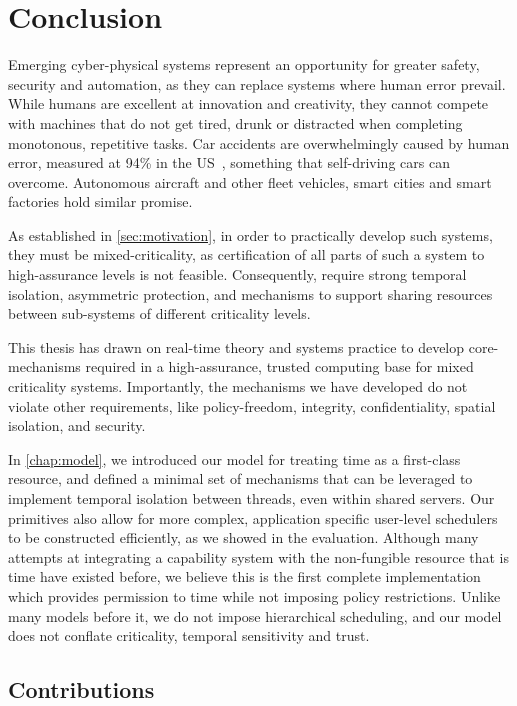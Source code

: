 \chapter{Conclusion}
\label{chap:conclusion}

Emerging cyber-physical systems represent an opportunity for greater safety, security and 
automation, as they can replace systems where human error prevail. While humans are excellent at
innovation and creativity, they cannot compete with machines that do not get tired, drunk or
distracted when completing
monotonous, repetitive tasks. Car accidents are overwhelmingly 
caused by human error, measured at 94\% in the US~\citep{Singh_15}, something that self-driving cars can overcome. Autonomous aircraft and other fleet vehicles, smart cities and smart factories hold similar promise. 

As established in \cref{sec:motivation}, in order to practically develop such systems,
they must be mixed-criticality, as certification of all parts of such a system to high-assurance
levels is not feasible. Consequently, require strong temporal isolation, asymmetric protection, 
and mechanisms to support sharing resources between sub-systems of different criticality levels. 

This thesis has drawn on real-time theory and systems practice to develop core-mechanisms required
in a high-assurance, trusted computing base for mixed criticality systems. Importantly, the
mechanisms we have developed do not violate other requirements, like policy-freedom, integrity,
confidentiality, spatial isolation, and security. 

In \cref{chap:model}, we introduced our model for treating time as a first-class resource, and 
defined a minimal set of
mechanisms that can be leveraged to implement temporal isolation between threads, even within shared
servers. Our primitives also allow for more complex, application specific user-level schedulers to
be constructed efficiently, as we showed in the evaluation. Although many attempts at integrating a
capability system with the non-fungible resource that is time have existed before, we believe this is
the first complete implementation which provides permission to time while not imposing policy
restrictions. Unlike many models before it, we do not impose hierarchical scheduling, and our model
does not conflate criticality, temporal sensitivity and trust.
\clearpage

\section{Contributions}

